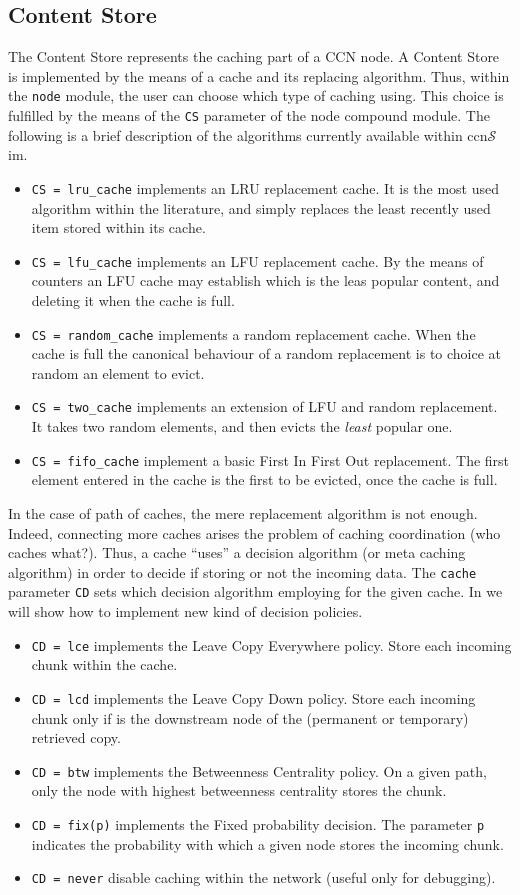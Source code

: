\documentclass{book}
\newcommand{\ccnsim}{ccn$\mathcal{S}$im}
\begin{document}
\subsection{Content Store}
The Content Store represents the caching part of a CCN node. A Content Store is implemented by the means of a cache and its replacing algorithm. Thus, within the \verb|node| module, the user can choose which type of caching using. This choice is fulfilled by the means of the  \verb|CS| parameter of the node compound module. The following is a brief description of the algorithms currently available  within \ccnsim. 
\begin{itemize}
    \item\verb|CS = lru_cache| implements an LRU replacement cache. It is the most used algorithm within the literature, and simply replaces the least recently used item stored within its cache. 
    \item\verb|CS = lfu_cache| implements an LFU replacement cache. By the means of counters an LFU cache may establish which is the leas popular content, and deleting it when the cache is full. 
    \item\verb|CS = random_cache| implements a random replacement cache. When the cache is full the canonical behaviour of a random replacement is to choice at random an element to evict. 
    \item\verb|CS = two_cache| implements an extension of LFU and random replacement. It takes two random elements, and then evicts the \emph{least} popular one. 
    \item\verb|CS = fifo_cache| implement a basic First In First Out replacement. The first element entered in the cache is the first to be evicted, once the cache is full. 
\end{itemize}
In the case of path of caches, the mere replacement algorithm is not enough. Indeed, connecting more caches arises the problem of caching coordination (who caches what?). Thus, a cache ``uses'' a decision algorithm (or meta caching algorithm) in order to decide if storing or not the incoming data. The \verb|cache| parameter \verb|CD| sets which decision algorithm employing for the given cache. In  we will show how to implement new kind of decision policies.
\begin{itemize}
    \item \verb|CD = lce| implements the Leave Copy Everywhere policy. Store each incoming chunk within the cache. 
    \item \verb|CD = lcd| implements the Leave Copy Down policy. Store each incoming chunk only if is the downstream node of the (permanent or temporary) retrieved copy.
    \item \verb|CD = btw| implements the Betweenness Centrality policy. On a given path, only the node with highest betweenness centrality stores the chunk.
    \item \verb|CD = fix(p)| implements the Fixed probability decision. The parameter \verb|p| indicates the probability with which a given node stores the incoming chunk.
    \item \verb|CD = never| disable caching within the network (useful only for debugging).
\end{itemize}
\end{document}

